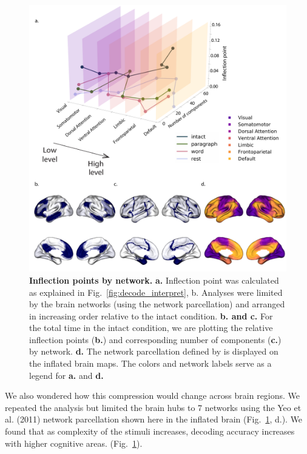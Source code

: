 \documentclass[english]{article}
\begin{document}
\begin{figure}
  \centering
  \includegraphics[width=\textwidth]{figs/decode_pcs_network.pdf}
  \caption{\textbf{Inflection points by network.} \textbf{a.}
    Inflection point was calculated as explained in
    Fig.~\ref{fig:decode_interpret}, b. Analyses were limited by the
    brain networks (using the \cite{YeoEtal11} network parcellation) and
    arranged in increasing order relative to the intact condition.
    \textbf{b. and c.} For the total time in the intact condition, we are plotting the relative inflection points (\textbf{b.}) and corresponding number of components (\textbf{c.}) by network. \textbf{d.} The network parcellation defined by \cite{YeoEtal11} is displayed on the inflated brain maps. The colors and network labels serve as a legend for \textbf{a.} and \textbf{d.}}
  \label{fig:decode_pcs_network}
\end{figure}

We also wondered how this compression would change across brain regions.  We repeated the analysis but limited the brain hubs to 7 networks using the Yeo et al. (2011) network parcellation shown here in the inflated brain (Fig.~\ref{fig:decode_pcs_network}, d.). We found that as complexity of the stimuli increases, decoding accuracy increases
with higher cognitive areas. (Fig.~\ref{fig:decode_pcs_network}).
\end{document}
